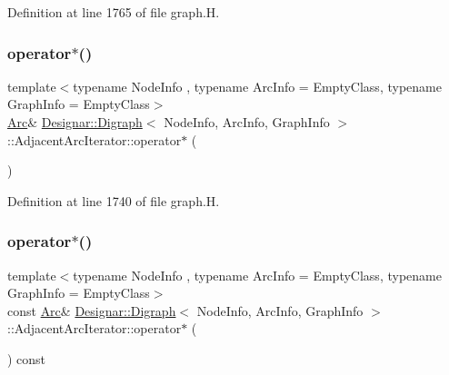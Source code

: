 Definition at line 1765 of file graph.\+H.

\mbox{\label{class_designar_1_1_digraph_1_1_adjacent_arc_iterator_a2a1ee85a8076e07fd99d35676ec69887}} 
\subsubsection{\texorpdfstring{operator$\ast$()}{operator*()}\hspace{0.1cm}{\footnotesize\ttfamily [1/2]}}
{\footnotesize\ttfamily template$<$typename Node\+Info , typename Arc\+Info  = Empty\+Class, typename Graph\+Info  = Empty\+Class$>$ \\
\hyperlink{class_designar_1_1_digraph_a0ceb278671f2a535c00fddccdeafd69f}{Arc}\& \hyperlink{class_designar_1_1_digraph}{Designar\+::\+Digraph}$<$ Node\+Info, Arc\+Info, Graph\+Info $>$\+::Adjacent\+Arc\+Iterator\+::operator$\ast$ (\begin{DoxyParamCaption}{ }\end{DoxyParamCaption})\hspace{0.3cm}{\ttfamily [inline]}}



Definition at line 1740 of file graph.\+H.

\mbox{\label{class_designar_1_1_digraph_1_1_adjacent_arc_iterator_aaf54c97702c3b6e3ccf419c2f7966e44}} 
\subsubsection{\texorpdfstring{operator$\ast$()}{operator*()}\hspace{0.1cm}{\footnotesize\ttfamily [2/2]}}
{\footnotesize\ttfamily template$<$typename Node\+Info , typename Arc\+Info  = Empty\+Class, typename Graph\+Info  = Empty\+Class$>$ \\
const \hyperlink{class_designar_1_1_digraph_a0ceb278671f2a535c00fddccdeafd69f}{Arc}\& \hyperlink{class_designar_1_1_digraph}{Designar\+::\+Digraph}$<$ Node\+Info, Arc\+Info, Graph\+Info $>$\+::Adjacent\+Arc\+Iterator\+::operator$\ast$ (\begin{DoxyParamCaption}{ }\end{DoxyParamCaption}) const\hspace{0.3cm}{\ttfamily [inline]}}




